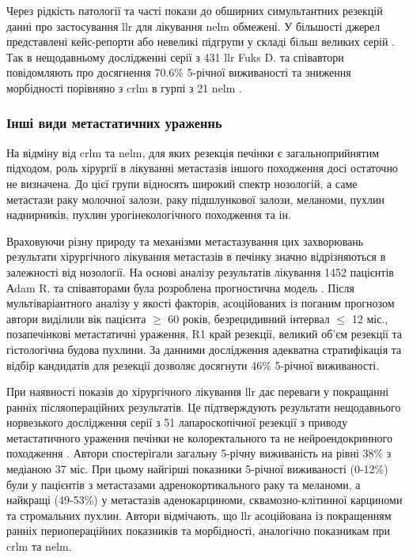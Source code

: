 Через рідкість патології та часті покази до обширних симультантних резекцій данні про застосування \acrshort{llr} для лікування \acrshort{nelm} обмежені. У більшості джерел представлені кейс-репорти або невеликі підгрупи у складі більш великих серій \cite{Passuello2016}. Так в нещодавньому дослідженні серії з 431 \acrshort{llr} Fuks D. та співавтори повідомляють про досягнення 70.6\% 5-річної виживаності та зниження морбідності порівняно з  \acrshort{crlm}  в гурпі з 21 \acrshort{nelm} \cite{Triantafyllidis2019}.


\subsubsection{Інші види метастатичних ураженнь}

На відміну від \acrshort{crlm} та \acrshort{nelm}, для яких резекція печінки є загальноприйнятим підходом, роль хірургії в лікуванні метастазів іншого походження досі остаточно не визначена. До цієї групи відносять широкий спектр нозологій, а саме метастази раку молочної залози, раку підшлункової залози, меланоми, пухлин наднирників, пухлин урогінекологічного походження та ін. 

Враховуючи різну природу та механізми метастазування цих захворювань результати хірургічного лікування метастазів в печінку значно відрізняються в залежності від нозології. На основі аналізу результатів лікування 1452 пацієнтів Аdam R. та співавторами була розроблена прогностична модель \cite{Adam2006}. Після мультіваріантного аналізу у якості факторів, асоційованих із поганим прогнозом автори виділили вік пацієнта $\geq$ 60 років, безрецидивний інтервал $\leq$ 12 міс., позапечінкові метастатичні ураження, R1 край резекції, великий об'єм резекції та гістологічна будова пухлини. За данними дослідження адекватна стратифікація та відбір кандидатів для резекції дозволяє досягнути 46\% 5-річної виживаності.

При наявності показів до хірургічного лікування \acrshort{llr} дає переваги у покращанні ранніх післяопераційних результатів. Це підтверждують результати нещодавнього норвезького дослідження серії з 51 лапароскопічної резекції з приводу метастатичного ураження печінки не колоректального та не нейроендокринного походження \cite{Aghayan2019}. Автори спостерігали загальну 5-річну виживаність на рівні 38\% з медіаною 37 міс. При цьому найгірші показники 5-річної виживаності (0-12\%) були у пацієнтів з метастазами адренокортикального раку та меланоми, а найкращі (49-53\%) у метастазів аденокарциноми, сквамозно-клітинної карциноми та стромальних пухлин. Автори відмічають, що  \acrshort{llr} асоційована із покращенням ранніх периопераційних показників та морбідності, аналогічно показникам при \acrshort{crlm} та \acrshort{nelm}.

